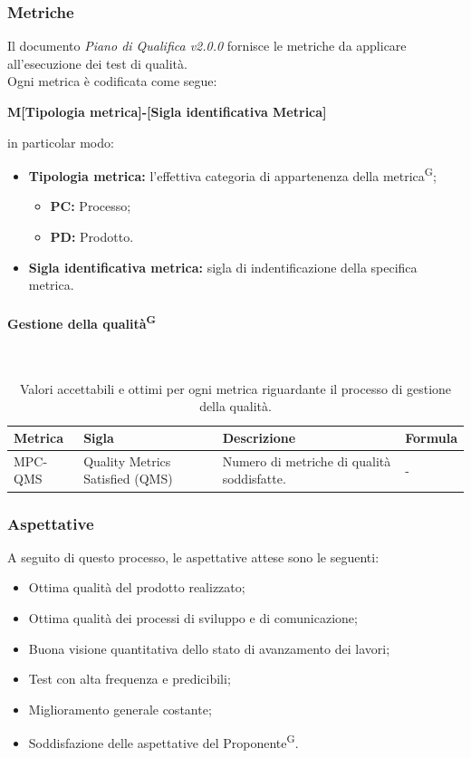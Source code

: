 \documentclass[8pt]{article}
\newcommand{\glossterm}[1]{#1\textsuperscript{G}} %
\newcommand{\subsubsubsection}[1]{\paragraph{#1}\mbox{}\\}
\begin{document}
\subsubsection{Metriche}
Il documento \textit{Piano di Qualifica v2.0.0} fornisce le metriche da applicare all'esecuzione dei test di qualità.
\\Ogni metrica è codificata come segue:
\begin{center}
    \textbf{M[Tipologia metrica]-[Sigla identificativa Metrica]}
\end{center}
in particolar modo:
\begin{itemize}
	\item\textbf{Tipologia metrica:} l'effettiva categoria di appartenenza della
      \glossterm{metrica};
	\begin{itemize}
    \item \textbf{PC:} Processo;
		\item \textbf{PD:} Prodotto.
	\end{itemize}
	\item\textbf{Sigla identificativa metrica:} sigla di indentificazione della specifica metrica.
\end{itemize}
\subsubsubsection{Gestione della \glossterm{qualità}} \label{sec:gestione_qualita}
\begin{table}[H]	
	\centering
	\begin{tabular}{p{2cm} p{3cm} p{6cm} p{4cm}}
		\toprule
		\textbf{Metrica}& \textbf{Sigla} & \textbf{Descrizione} & \textbf{Formula} \\
		\midrule
		MPC-QMS & Quality Metrics Satisfied (QMS) & Numero di metriche di qualità soddisfatte. & - \\
		\bottomrule
	\end{tabular}
	\caption{Valori accettabili e ottimi per ogni metrica riguardante il processo di gestione della qualità.}
	\label{table:Valori accettabili e ottimi per ogni metrica riguardante il processo di gestione della qualità.}
\end{table}

\subsubsection{Aspettative}
A seguito di questo processo, le aspettative attese sono le seguenti:
\begin{itemize}
    \item Ottima qualità del prodotto realizzato;
    \item Ottima qualità dei processi di sviluppo e di comunicazione;
    \item Buona visione quantitativa dello stato di avanzamento dei lavori;
    \item Test con alta frequenza e predicibili;
    \item Miglioramento generale costante;
    \item Soddisfazione delle aspettative del \glossterm{Proponente}.
\end{itemize}
\clearpage
\end{document}

